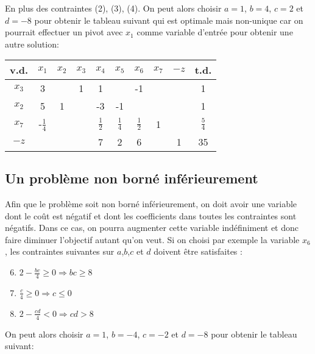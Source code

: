 En plus des contraintes (2), (3), (4). On peut alors choisir $a = 1$, $b=4$, $c=2$ et $d=-8$ pour obtenir le tableau suivant qui est optimale mais non-unique car on pourrait effectuer un pivot avec $x_1$ comme variable d’entrée pour obtenir une autre solution:
	
\begin{center}
	\renewcommand{\arraystretch}{1.5}
	\begin{tabular}{|c|cccccccc|c|}
		\hline
		v.d.  &     $x_1$      & $x_2$ & $x_3$ &     $x_4$     &     $x_5$     &     $x_6$     & $x_7$ & $-z$ &     t.d.      \\ \hline
		$x_3$ &       3        &       &   1   &       1       &               &      -1       &       &      &       1       \\
		$x_2$ &       5        &   1   &       &      -3       &      -1       &               &       &      &       1       \\
		$x_7$ & -$\frac{1}{4}$ &       &       & $\frac{1}{2}$ & $\frac{1}{4}$ & $\frac{1}{2}$ &   1   &      & $\frac{5}{4}$ \\ \hline
		$-z$  &                &       &       &       7       &       2       &       6       &       &  1   &      35       \\ \hline
	\end{tabular}
\end{center}

\subsection{Un problème non borné inférieurement}
Afin que le problème soit non borné inférieurement, on doit avoir une variable dont le coût est négatif et dont les coefficients dans toutes les contraintes sont négatifs. Dans ce cas, on pourra augmenter cette variable indéfiniment et donc faire diminuer l’objectif autant qu’on veut. Si on choisi par exemple la variable $x_6$, les contraintes suivantes sur $a$,$b$,$c$ et $d$ doivent être satisfaites :
\begin{enumerate}[label=(\arabic*),itemsep=1pt]
	\setcounter{enumi}{5}
	\item $2 - \frac{bc}{4} \geq 0 \Rightarrow bc \geq 8$
	\item $\frac{c}{4} \geq 0 \Rightarrow  c \leq 0$
	\item $2 - \frac{cd}{4} < 0 \Rightarrow cd > 8$
\end{enumerate}

On peut alors choisir $a = 1$, $b = -4$, $c = -2$ et $d = -8$ pour obtenir le tableau suivant:
	
